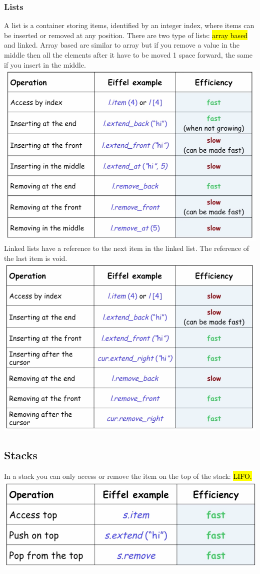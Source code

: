 \documentclass[11pt]{article}
\newcommand\back[1][-3cm]{\hspace*{#1}}
\begin{document}
\subsubsection{Lists}
A list is a container storing items, identified by an integer index, where items can be inserted or removed at any position. There are two type of lists: \hl{array based} and linked. Array based are similar to array but if you remove a value in the middle then all the elements after it have to be moved 1 space forward, the same if you insert in the middle.\\
\back\includegraphics{list}\\
Linked lists have a reference to the next item in the linked list. The reference of the last item is void.\\
\back\includegraphics{linked}
\subsection{Stacks}
In a stack you can only access or remove the item on the top of the stack: \hl{LIFO.}\\
\back\includegraphics{stack}
\end{document}
